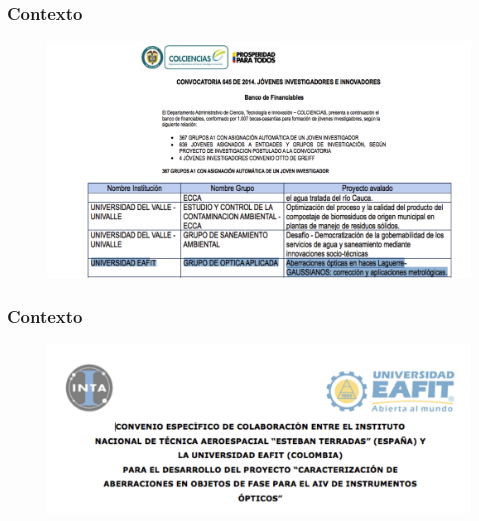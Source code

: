 \documentclass[xcolor=table,serif]{beamer}
\begin{document}
 \begin{frame}
   \frametitle{Contexto}
   \begin{figure}
     \centering
     \includegraphics[scale = .5]{Figures/presentation/jovenes_inv_conv.png}
   \end{figure}
 \end{frame}
 \begin{frame}
   \frametitle{Contexto}
   \begin{figure}
     \centering
     \includegraphics[scale = .5]{Figures/presentation/inta_conv.png}
   \end{figure}
 \end{frame}
\end{document}
